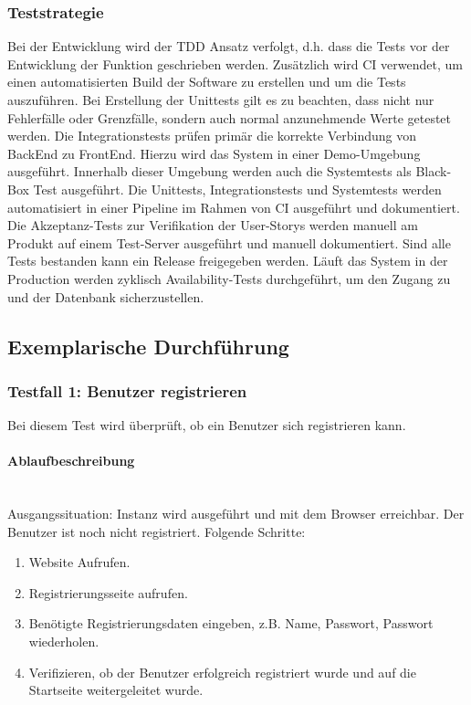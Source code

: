 \subsubsection*{Teststrategie}
Bei der Entwicklung wird der \ac{TDD} Ansatz verfolgt, d.h. dass die Tests vor der Entwicklung der Funktion geschrieben werden.
Zusätzlich wird \ac{CI} verwendet, um einen automatisierten Build der Software zu erstellen und um die Tests auszuführen.
Bei Erstellung der Unittests gilt es zu beachten, dass nicht nur Fehlerfälle oder Grenzfälle, sondern auch normal anzunehmende Werte getestet werden.
Die Integrationstests prüfen primär die korrekte Verbindung von BackEnd zu FrontEnd.
Hierzu wird das System in einer Demo-Umgebung ausgeführt.
Innerhalb dieser Umgebung werden auch die Systemtests als Black-Box Test ausgeführt.
\newparagraph
Die Unittests, Integrationstests und Systemtests werden automatisiert in einer Pipeline im Rahmen von \ac{CI} ausgeführt und dokumentiert.
Die Akzeptanz-Tests zur Verifikation der User-Storys werden manuell am Produkt auf einem Test-Server ausgeführt und manuell dokumentiert. 
Sind alle Tests bestanden kann ein Release freigegeben werden.
Läuft das System in der Production werden zyklisch Availability-Tests durchgeführt, um den Zugang zu  und der Datenbank sicherzustellen.
\subsection{Exemplarische Durchführung}
\subsubsection{Testfall 1: Benutzer registrieren}
Bei diesem Test wird überprüft, ob ein Benutzer sich registrieren kann.
\paragraph{Ablaufbeschreibung} \mbox{}\\
Ausgangssituation: Instanz wird ausgeführt und mit dem Browser erreichbar. Der Benutzer ist noch nicht registriert. Folgende Schritte:

\begin{enumerate}
  \item Website Aufrufen.
  \item Registrierungsseite aufrufen.
  \item Benötigte Registrierungsdaten eingeben, z.B. Name, Passwort, Passwort wiederholen.
  \item Verifizieren, ob der Benutzer erfolgreich registriert wurde und auf die Startseite weitergeleitet wurde.
\end{enumerate}

